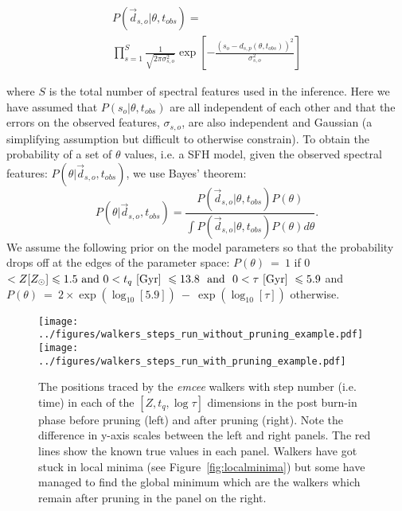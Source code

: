 \documentclass[useAMS,usenatbib]{mn2e}
\begin{document}
\begin{multline}\label{like}
P(\vec{d}_{s, o}|\theta, t_{obs}) = \\ \prod_{s=1}^{S} \frac{1}{\sqrt{2\pi\sigma_{s,o}^2}} \exp{\left[ - \frac{(s_{o} - d_{s, p}(\theta, t_{obs}))^2}{\sigma_{s, o}^2} \right]}
\end{multline}

where $S$ is the total number of spectral features used in the inference. Here we have assumed that $P(s_{o}|\theta, t_{obs})$ are all independent of each other and that the errors on the observed features, $\sigma_{s, o}$, are also independent and Gaussian (a simplifying assumption but difficult to otherwise constrain). To obtain the probability of a set of $\theta$ values, i.e. a SFH model, given the observed spectral features: $P(\theta|\vec{d}_{s,o}, t_{obs})$, we use Bayes' theorem:
 \begin{equation}\label{big}
P(\theta|\vec{d}_{s,o}, t_{obs}) = \frac{P(\vec{d}_{s,o}|\theta, t_{obs})P(\theta)}{\int P(\vec{d}_{s,o} |\theta, t_{obs})P(\theta) d\theta}.
\end{equation}
We assume the following prior on the model parameters so that the probability drops off at the edges of the parameter space: ${P(\theta)~=~1}$ if 0 $< Z [Z_{\odot}] \leq 1.5 \text{ and } 0 < t_q ~\rm{[Gyr]}~ \leq 13.8 ~ \text{ and } ~ 0 < \tau  ~\rm{[Gyr]}~ \leq 5.9$ and ${P(\theta)~=~2\times\exp\left(\log_{10}[5.9]\right)~-~\exp\left(\log_{10}[\tau]\right)}$ otherwise.



\begin{figure*}
\centering
\texttt{[image: ../figures/walkers\_steps\_run\_without\_pruning\_example.pdf]}
\texttt{[image: ../figures/walkers\_steps\_run\_with\_pruning\_example.pdf]}
\caption{The positions traced by the \emph{emcee} walkers with step number (i.e. time) in each of the $[Z, t_q, \log \tau]$ dimensions in the post burn-in phase before pruning (left) and after pruning (right). Note the difference in y-axis scales between the left and right panels. The red lines show the known true values in each panel. Walkers have got stuck in local minima (see Figure~\ref{fig:localminima}) but some have managed to find the global minimum which are the walkers which remain after pruning in the panel on the right.}
\label{fig:comparepruning}
\end{figure*}
\end{document}
